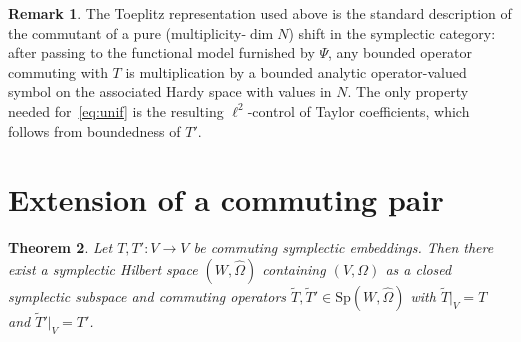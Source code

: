 \documentclass[11pt,a4paper]{article}
\newtheorem{theorem}{Theorem}[section]
\theoremstyle{definition}
\newtheorem{remark}[theorem]{Remark}
\begin{document}
\begin{remark}
\label{rem:Toeplitz}
The Toeplitz representation used above is the standard description of the commutant of a pure
(multiplicity-\(\dim N\)) shift in the symplectic category: after passing to the functional model
furnished by \(\Psi\), any bounded operator commuting with \(T\) is multiplication by a bounded
analytic operator-valued symbol on the associated Hardy space with values in \(N\). The only
property needed for~\eqref{eq:unif} is the resulting \(\ell^2\)-control of Taylor coefficients,
which follows from boundedness of \(T'\).
\end{remark}

\section{Extension of a commuting pair}

\begin{theorem}
\label{thm:B}
Let \(T,T':V\to V\) be commuting symplectic embeddings. Then there exist a symplectic Hilbert space
\((W,\widehat{\Omega})\) containing \((V,\Omega)\) as a closed symplectic subspace and commuting
operators \(\widetilde{T},\widetilde{T}'\in\mathrm{Sp}(W,\widehat{\Omega})\) with
\(\widetilde{T}|_V=T\) and \(\widetilde{T}'|_V=T'\).
\end{theorem}
\end{document}
